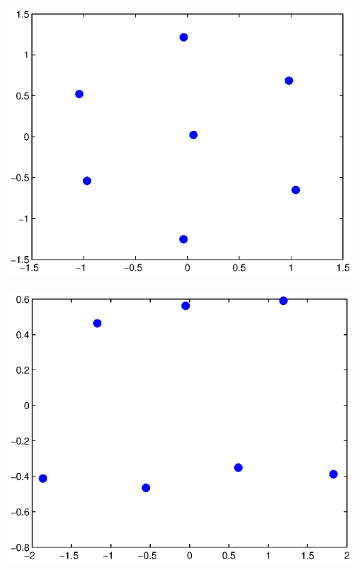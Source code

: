 \begin{figure}[t]
\begin{subfigure}{7cm}
\includegraphics[width=\textwidth]{config1}
\end{subfigure}
%
\begin{subfigure}{7cm}
\includegraphics[width=\textwidth]{config4}
\end{subfigure}


\end{figure}
